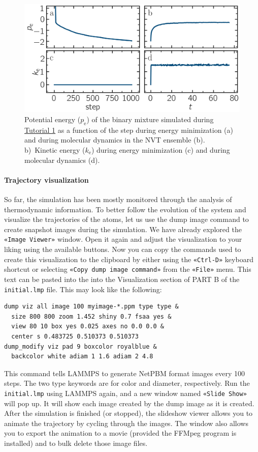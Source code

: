 \documentclass[9pt,tutorial]{livecoms}
\newcommand{\lmpcmd}[1]{\hspace{0pt}\colorbox{listing}{\textcolor{command}{\small{#1}}}\hspace{0pt}} %
\newcommand{\flecmd}[1]{\textcolor{command}{\texttt{#1}}} %
\newcommand{\guicmd}[1]{\textcolor{command}{\texttt{«#1»}}} %
\begin{document}
\begin{figure}
\centering
\includegraphics[width=\linewidth]{LJ-energy}
\caption{Potential energy ($p_\text{e}$) of the binary mixture simulated
during \hyperref[lennard-jones-label]{Tutorial 1} as a function of the step
during energy minimization (a) and during molecular dynamics in the NVT ensemble (b).
b)~Kinetic energy ($k_\text{e}$) during energy minimization (c) and during
molecular dynamics (d).}
\label{fig:evolution-energy}
\end{figure}

\paragraph{Trajectory visualization}

So far, the simulation has been mostly monitored through the analysis of
thermodynamic information.  To better follow the evolution of the system and visualize
the trajectories of the atoms, let us use the \lmpcmd{dump image} command to
create snapshot images during the simulation.  We have already explored
the \guicmd{Image Viewer} window.  Open it again and adjust the
visualization to your liking using the available buttons.  Now you can
copy the commands used to create this visualization to the clipboard
by either using the \guicmd{Ctrl-D} keyboard shortcut or selecting
\guicmd{Copy dump image command} from the \guicmd{File} menu.  This text
can be pasted into the into the \lmpcmd{Visualization} section of
\lmpcmd{PART B} of the \flecmd{initial.lmp} file.  This may look like the following:
\begin{lstlisting}
dump viz all image 100 myimage-*.ppm type type &
  size 800 800 zoom 1.452 shiny 0.7 fsaa yes &
  view 80 10 box yes 0.025 axes no 0.0 0.0 &
  center s 0.483725 0.510373 0.510373
dump_modify viz pad 9 boxcolor royalblue &
  backcolor white adiam 1 1.6 adiam 2 4.8
\end{lstlisting}
This command tells LAMMPS to generate NetPBM format images every 100
steps.  The two \lmpcmd{type} keywords are for \lmpcmd{color} and
\lmpcmd{diameter}, respectively.  Run the \flecmd{initial.lmp} using
LAMMPS again, and a new window named \guicmd{Slide Show} will pop up.
It will show each image created by the \lmpcmd{dump image} as it is
created. After the simulation is finished (or stopped), the slideshow
viewer allows you to animate the trajectory by cycling through the
images.  The window also allows you to export the animation to a movie
(provided the FFMpeg program is installed) and to bulk delete those
image files.
\end{document}
